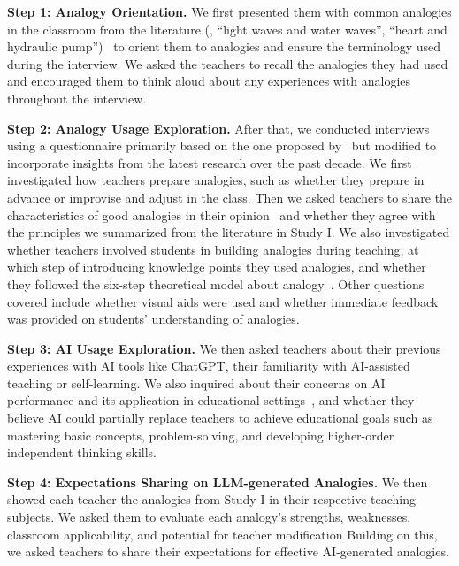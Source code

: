 \textbf{Step 1: Analogy Orientation.} 
We first presented them with common analogies in the classroom from the literature (\eg, ``light waves and water waves'', ``heart and hydraulic pump'')~\cite{oliva_teaching_2007} to orient them to analogies and ensure the terminology used during the interview.
We asked the teachers to recall the analogies they had used and encouraged them to think aloud about any experiences with analogies throughout the interview.

\textbf{Step 2: Analogy Usage Exploration.}
After that, we conducted interviews using a questionnaire primarily based on the one proposed by~\cite{oliva_teaching_2007} but modified to incorporate insights from the latest research over the past decade.
We first investigated how teachers prepare analogies, such as whether they prepare in advance or improvise and adjust in the class. 
Then we asked teachers to share the characteristics of good analogies in their opinion~\cite{gray_teaching_2021} and whether they agree with the principles we summarized from the literature in Study I. 
We also investigated whether teachers involved students in building analogies during teaching, at which step of introducing knowledge points they used analogies, and whether they followed the six-step theoretical model about analogy~\cite{richland_analogy_2015}.
Other questions covered include whether visual aids were used and whether immediate feedback was provided on students' understanding of analogies.

\textbf{Step 3: AI Usage Exploration.}
We then asked teachers about their previous experiences with AI tools like ChatGPT, their familiarity with AI-assisted teaching or self-learning. 
We also inquired about their concerns on AI performance and its application in educational settings~\cite{chen2024stugptviz,tan_more_2024}, and whether they believe AI could partially replace teachers to achieve educational goals such as mastering basic concepts, problem-solving, and developing higher-order independent thinking skills.

\textbf{Step 4: Expectations Sharing on LLM-generated Analogies.}
We then showed each teacher the analogies from Study I in their respective teaching subjects.
We asked them to evaluate each analogy's strengths, weaknesses, classroom applicability, and potential for teacher modification
Building on this, we asked teachers to share their expectations for effective AI-generated analogies.

